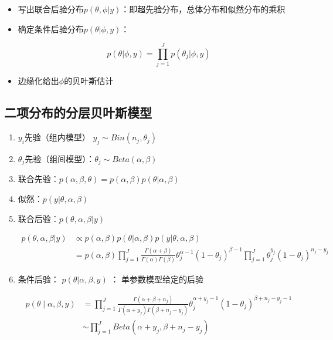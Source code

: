 \begin{itemize}
\item
  写出联合后验分布\(p(\theta,\phi|y)\)：即超先验分布，总体分布和似然分布的乘积
\item
  确定条件后验分布\(p(\theta|\phi,y)\)：

  \[p(\theta|\phi,y)=\prod_{j=1}^J p(\theta_j|\phi,y)\]
\item
  边缘化给出\(\phi\)的贝叶斯估计
\end{itemize}


\subsection{二项分布的分层贝叶斯模型}

\begin{enumerate}
\def\labelenumi{\arabic{enumi}.}
\item
  \(y_i\)先验（组内模型） \(y_j \sim Bin(n_j,\theta_j)\)
\item
  \(\theta_j\)先验（组间模型）：\(\theta_j\sim Beta(\alpha,\beta)\)
\item
  联合先验：\(p(\alpha,\beta,\theta)=p(\alpha,\beta)p(\theta|\alpha,\beta)\)
\item
  似然：\(p(y|\theta,\alpha,\beta)\)
\item
  联合后验：\(p(\theta,\alpha,\beta|y)\)

\begin{equation}
  \begin{aligned}
    p(\theta,\alpha,\beta|y)
    &\propto p(\alpha,\beta)p(\theta|\alpha,\beta)p(y|\theta,\alpha,\beta)\\
    &=p(\alpha,\beta)\prod_{j=1}^{J}
    \frac{\Gamma(\alpha+\beta)}{\Gamma(\alpha)\Gamma(\beta)}
    \theta_j^{\alpha-1}(1-\theta_j)^{\beta-1}
    \prod_{j=1}^{J}
    \theta_j^{y_j}(1-\theta_j)^{n_j-y_j}
    \end{aligned}
\end{equation}

\item
  条件后验： \(p(\theta|\alpha,\beta,y)\) ： 单参数模型给定的后验

\begin{equation}
  \begin{aligned}
    p(\theta \mid \alpha, \beta, y)
    &=\prod_{j=1}^{J} \frac{\Gamma\left(\alpha+\beta+n_{j}\right)}{\Gamma\left(\alpha+y_{j}\right) \Gamma\left(\beta+n_{j}-y_{j}\right)} 
    \theta_{j}^{\alpha+y_{j}-1}\left(1-\theta_{j}\right)^{\beta+n_{j}-y_{j}-1}\\
    &\sim \prod _{j=1}^JBeta(\alpha+y_j,\beta+n_j-y_j)
    \end{aligned}
\end{equation}


\end{enumerate}
